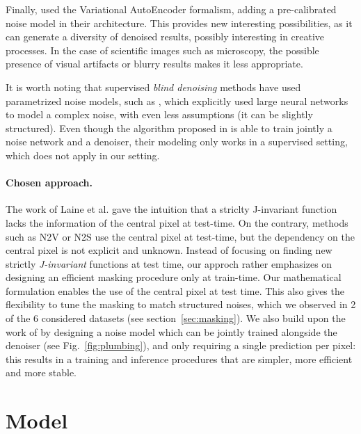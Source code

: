 \documentclass{article}
\begin{document}
Finally, \cite{2020DivNoising} used the Variational Auto\-Encoder formalism, adding a pre-calibrated noise model in their architecture. This provides new interesting possibilities, as it can generate a diversity of denoised results, possibly interesting in creative processes. In the case of scientific images such as microscopy, the possible presence of visual artifacts or blurry results makes it less appropriate.

It is worth noting that supervised \textit{blind denoising} methods have used parametrized noise models, such as \cite{zhang2017beyond,yue2019variational}, which explicitly used large neural networks to model a complex noise, with even less assumptions (it can be slightly structured). Even though the algorithm proposed in \cite{yue2019variational} is able to train jointly a noise network and a denoiser, their modeling only works in a supervised setting, which does not apply in our setting.

\paragraph{Chosen approach.} The work of Laine et al. \cite{laine2019high} gave the intuition that a striclty J-invariant function lacks the information of the central pixel at test-time. On the contrary, methods such as N2V or N2S use the central pixel at test-time, but the dependency on the central pixel is not explicit and unknown. Instead of focusing on finding new strictly \textit{J-invariant} functions at test time, our approch rather emphasizes on designing an efficient masking procedure only at train-time. Our mathematical formulation enables the use of the central pixel at test time.
This also gives the flexibility to tune the masking to match structured noises, which we observed in 2 of the 6 considered datasets (see section~\ref{sec:masking}).
We also build upon the work of \cite{laine2019high, krull2019probabilistic} by designing a noise model which can be jointly trained alongside the denoiser (see Fig.~\ref{fig:plumbing}), and only requiring a single prediction per pixel: this results in a training and inference procedures that are simpler, more efficient and more stable.

\section{Model}
\label{sec:model}
\end{document}
